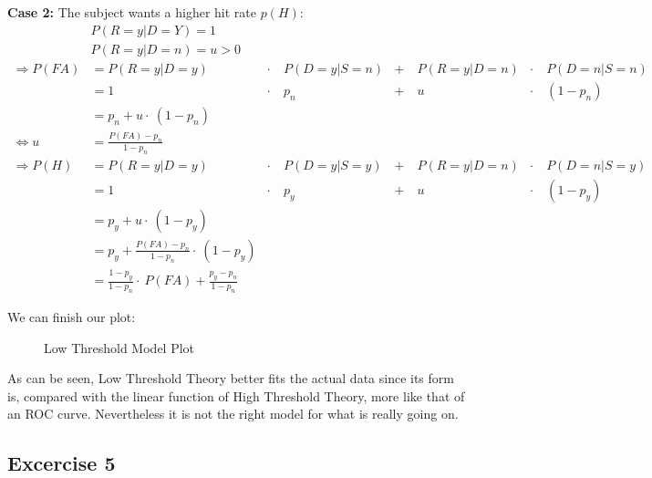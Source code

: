 \documentclass[../main/Notes.tex]{subfiles}
\begin{document}
\textbf{Case 2:} The subject wants a higher hit rate $p(H)$:
\begin{align*}
& P\left(R=y|D=Y\right) = 1 \\
& P\left(R=y|D=n\right) = u > 0\\
\Rightarrow P(FA) & = P\left(R=y|D=y\right) &\cdot~& P\left(D=y|S=n\right) &+~&P\left(R=y|D=n\right)&\cdot~ & P\left(D=n|S=n\right) \\
& = 1 &\cdot~& p_{n} &+~& u &\cdot~& \left(1-p_{n}\right) \\
& = p_{n} + u \cdot~ \left(1-p_{n}\right)\\
\Leftrightarrow u &= \frac{P(FA)-p_{n}}{1-p_{n}} \\
\Rightarrow P(H) & = P\left(R=y|D=y\right) &\cdot~& P\left(D=y|S=y\right) &+~&P\left(R=y|D=n\right)&\cdot~ & P\left(D=n|S=y\right) \\
& = 1 &\cdot~& p_{y} &+~& u &\cdot~& \left(1-p_{y}\right) \\
& = p_{y} +  u \cdot~  \left(1-p_{y}\right)\\
& = p_{y} +  \frac{P(FA)-p_{n}}{1-p_{n}} \cdot~  \left( 1-p_{y} \right)\\
& = \frac{1-p_{y}}{1-p_{n}} \cdot~ P(FA) + \frac{p_{y}-p_{n}}{1-p_{n}}
\end{align*}

We can finish our plot:
\begin{figure}[ht!]
  \centering
  \caption{Low Threshold Model Plot}
  \label{fig:2014-06-27_LowThrshPlot}
\end{figure}

As can be seen, Low Threshold Theory better fits the actual data since its form is, compared with the linear function of High Threshold Theory, more like that of an ROC curve. Nevertheless it is not the right model for what is really going on.

\subsection*{Excercise 5}\label{sheet6ex5}
\end{document}
